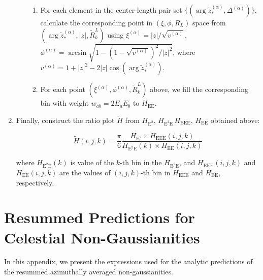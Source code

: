 \documentclass[letterpaper,11pt]{article}
\begin{document}
\begin{enumerate}
\begin{itemize}
\begin{enumerate}
    \item For each element in the center-length pair set
    \(\{(\arg \widetilde{z}_*^{(\alpha)},\Delta^{(\alpha)})\}\),
    calculate the corresponding point in \((\xi,\phi,R_L)\) space from
    \((\arg \widetilde{z}_*^{(\alpha)}, |z|, \widetilde{R}^L_k)\) using
    \(\xi^{(\alpha)} = |z|/\sqrt {v^{(\alpha)}}\), \(\phi^{(\alpha)} = \arcsin \sqrt{1-(1-\sqrt{v^{(\alpha)}})^2/|z|^2}\),
    where
    \(v^{(\alpha)}=1+|z|^2-2|z|\cos (\arg \widetilde{z}^{(\alpha)}_*)\).

    \item For each point
    \((\xi^{(\alpha)},\phi^{(\alpha)},\widetilde{R}^L_k)\) above, we
    fill the corresponding bin with weight
    $w_{ab}=2E_aE_b$ to
    \(H_{\mathrm{EE}}\).
  \end{enumerate}
  
  	\end{itemize}

  
\item Finally, construct the ratio plot \(\widetilde{H}\) from
  \(H_{\mathrm{E^2}},\, H_{\mathrm{E^2E}}\, H_{\mathrm{EEE}},\, H_{\mathrm{EE}}\)
  obtained above:
  
  \[\widetilde{H}(i,j,k) = \frac{\pi}{6}\frac{H_{\mathrm{E^2}} \times H_{\mathrm{EEE}}(i,j,k)}{H_{\mathrm{E^2E}}(k) \times H_{\mathrm{EE}}(i,j,k)}\]

  where \(H_{\mathrm{E^2E}}(k)\) is value of the \(k\)-th bin in the
  \(H_{\mathrm{E^2E}}\), and \(H_{\mathrm{EEE}}(i,j,k)\) and
  \(H_{\mathrm{EE}}(i,j,k)\) are the values of \((i,j,k)\)-th bin in
  \(H_{\mathrm{EEE}}\) and \(H_{\mathrm{EE}}\), respectively.
\end{enumerate}




\section{Resummed Predictions for Celestial Non-Gaussianities \label{sec:resum_formula}}

In this appendix, we present the expressions used for the analytic predictions of the resummed azimuthally averaged non-gaussianities.
\end{document}
